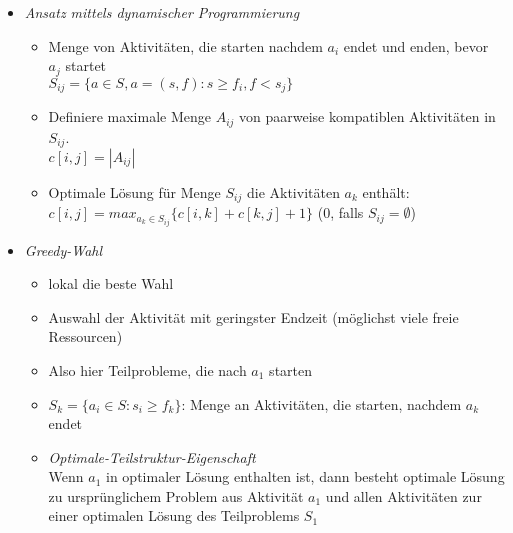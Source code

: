 \begin{itemize}
\begin{itemize}
                \item \textit{Ansatz mittels dynamischer Programmierung}
                    \begin{itemize}
                        \item Menge von Aktivitäten, die starten nachdem $a_i$ endet und enden, bevor $a_j$ startet \\
                                $S_{ij} = \{a \in S,a = (s,f): s \geq f_i, f < s_j\}$
                        \item Definiere maximale Menge $A_{ij}$ von paarweise kompatiblen Aktivitäten in $S_{ij}$. \\
                                $c[i,j] = |A_{ij}|$
                        \item Optimale Lösung für Menge $S_{ij}$ die Aktivitäten $a_k$ enthält: \\
                                $c[i,j] = max_{a_k\in S_{ij}}\{c[i,k] + c[k,j] + 1\}$ ($0$, falls $S_{ij} = \emptyset$)
                    \end{itemize}

                \item \textit{Greedy-Wahl}
                    \begin{itemize}
                        \item lokal die beste Wahl
                        \item Auswahl der Aktivität mit geringster Endzeit (möglichst viele freie Ressourcen)
                        \item Also hier Teilprobleme, die nach $a_1$ starten
                        \item $S_k = \{a_i \in S: s_i \geq f_k\}$: Menge an Aktivitäten, die starten, nachdem $a_k$ endet
                        \item \textit{Optimale-Teilstruktur-Eigenschaft} \\
                                Wenn $a_1$ in optimaler Lösung enthalten ist, dann besteht optimale Lösung zu ursprünglichem
                                Problem aus Aktivität $a_1$ und allen Aktivitäten zur einer optimalen Lösung des 
                                Teilproblems $S_1$
                    \end{itemize}


\end{itemize}
\end{itemize}
